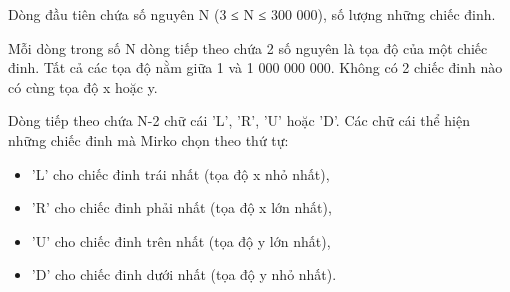 Dòng đầu tiên chứa số nguyên N (3 ≤ N ≤ 300 000), số lượng những chiếc đinh.  

   Mỗi dòng trong số N dòng tiếp theo chứa 2 số nguyên là tọa độ của một chiếc đinh. Tất cả các tọa độ nằm giữa 1 và 1 000 000 000. Không có 2 chiếc đinh nào có cùng tọa độ x hoặc y.  

   Dòng tiếp theo chứa N-2 chữ cái 'L', 'R', 'U' hoặc 'D'. Các chữ cái thể hiện những chiếc đinh mà Mirko chọn theo thứ tự:  
\begin{itemize}
	\item     'L' cho chiếc đinh trái nhất (tọa độ x nhỏ nhất),   
	\item     'R' cho chiếc đinh phải nhất (tọa độ x lớn nhất),   
	\item     'U' cho chiếc đinh trên nhất (tọa độ y lớn nhất),   
	\item     'D' cho chiếc đinh dưới nhất (tọa độ y nhỏ nhất).   
\end{itemize}